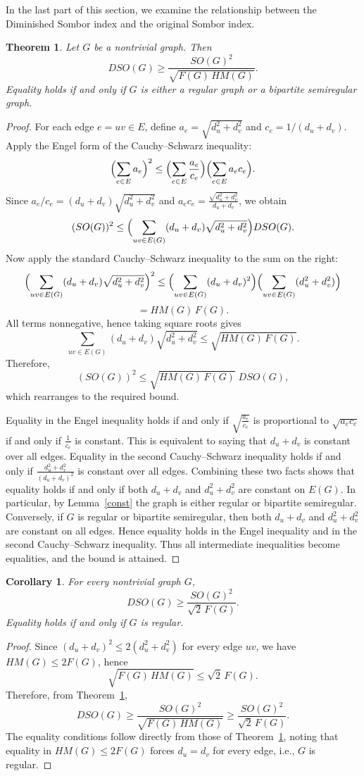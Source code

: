 \documentclass{article}
\newtheorem{theorem}{Theorem}
\newtheorem{corollary}{Corollary}
\theoremstyle{definition}
\begin{document}
In the last part of this section, we examine the relationship between the Diminished Sombor index and the original Sombor index.

\begin{theorem}\label{strong}
Let $G$ be a nontrivial graph. Then
\[
DSO(G)\ge \frac{SO(G)^2}{\sqrt{F(G)\,HM(G)}}.
\]
Equality holds if and only if $G$ is either a regular graph or a bipartite semiregular graph.
\end{theorem}
\begin{proof}
For each edge $e=uv\in E$, define $a_e = \sqrt{d_u^2+d_v^2}$ and $c_e = 1/(d_u+d_v)$. Apply the Engel form of the Cauchy--Schwarz inequality:
\[
\Bigl(\sum_{e\in E} a_e\Bigr)^2 \le \Bigl(\sum_{e\in E} \frac{a_e}{c_e}\Bigr) \Bigl(\sum_{e\in E} a_e c_e\Bigr).
\]
Since $a_e/c_e = (d_u+d_v)\sqrt{d_u^2+d_v^2}$ and $a_e c_e = \frac{\sqrt{d_u^2+d_v^2}}{d_u+d_v}$, we obtain
\[
(SO(G))^2 \le \Bigl(\sum_{uv\in E(G)} (d_u+d_v)\sqrt{d_u^2+d_v^2}\Bigr) DSO(G).
\]
Now apply the standard Cauchy--Schwarz inequality to the sum on the right:
\[
\Bigl(\sum_{uv\in E(G)} (d_u+d_v)\sqrt{d_u^2+d_v^2}\Bigr)^2
\le \Bigl(\sum_{uv\in E(G)} (d_u+d_v)^2\Bigr) \Bigl(\sum_{uv\in E(G)} (d_u^2+d_v^2)\Bigr)
\]
\[
= HM(G)\,F(G).
\]
All terms nonnegative, hence taking square roots gives
\[
\sum_{uv\in E(G)} (d_u+d_v)\sqrt{d_u^2+d_v^2} \le \sqrt{HM(G)\,F(G)}.
\]
Therefore,
\[
(SO(G))^2 \le \sqrt{HM(G)\,F(G)}\; DSO(G),
\]
which rearranges to the required bound.

Equality in the Engel inequality holds if and only if
$\sqrt{\frac{a_e}{c_e}}$ is proportional to $\sqrt{a_ec_e}$ if and only if $\frac{1}{c_e}$ is constant.
This is equivalent to saying that
$d_u+d_v$ is constant over all edges. 
Equality in the second Cauchy--Schwarz inequality holds if and only if
$\frac{d_u^2+d_v^2}{(d_u+d_v)^2}$ is
constant over all edges.
Combining these two facts shows that equality holds if and only if both
$d_u+d_v$
and
$d_u^2+d_v^2$
are constant on $E(G)$.
In particular,  by Lemma~\ref{const} the graph is either regular or bipartite semiregular.
Conversely, if $G$ is regular or bipartite semiregular, then both
$d_u+d_v$ and $d_u^2+d_v^2$ are constant on all edges.
Hence equality holds in the Engel inequality 
and in the second Cauchy--Schwarz inequality.
Thus all intermediate inequalities become equalities, and the bound is attained.
\end{proof}
\begin{corollary}\label{weak}
For every nontrivial graph $G$,
\[
DSO(G)\ge \frac{SO(G)^2}{\sqrt{2}\,F(G)}.
\]
Equality holds if and only if $G$ is regular.
\end{corollary}
\begin{proof}
Since $(d_u+d_v)^2\le 2(d_u^2+d_v^2)$ for every edge $uv$, we have $HM(G)\le 2F(G)$, hence
\[
\sqrt{F(G)\,HM(G)}\le \sqrt{2}\,F(G).
\]
Therefore, from Theorem~\ref{strong},
\[
DSO(G)\ge \frac{SO(G)^2}{\sqrt{F(G)\,HM(G)}}
\ge \frac{SO(G)^2}{\sqrt{2}\,F(G)}.
\]
The equality conditions follow directly from those of Theorem~\ref{strong}, noting that equality in $HM(G)\le 2F(G)$ forces $d_u=d_v$ for every edge, i.e., $G$ is regular.
\end{proof}
\end{document}
